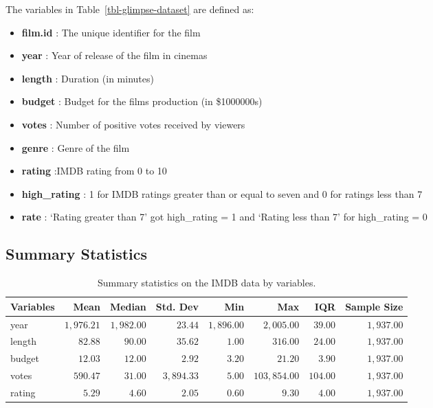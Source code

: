 \documentclass[
  letterpaper,
  DIV=11,
  numbers=noendperiod]{scrartcl}
\begin{document}
The variables in Table~\ref{tbl-glimpse-dataset} are defined as:

\begin{itemize}
\item
  \textbf{film.id} : The unique identifier for the film
\item
  \textbf{year} : Year of release of the film in cinemas
\item
  \textbf{length} : Duration (in minutes)
\item
  \textbf{budget} : Budget for the films production (in \$1000000s)
\item
  \textbf{votes} : Number of positive votes received by viewers
\item
  \textbf{genre} : Genre of the film
\item
  \textbf{rating} :IMDB rating from 0 to 10
\item
  \textbf{high\_rating} : 1 for IMDB ratings greater than or equal to
  seven and 0 for ratings less than 7
\item
  \textbf{rate} : `Rating greater than 7' got high\_rating = 1 and
  `Rating less than 7' for high\_rating = 0 \clearpage
\end{itemize}

\hypertarget{sec-sum}{%
\subsection{Summary Statistics}\label{sec-sum}}

\hypertarget{tbl-summary-statistics}{}
\begin{longtable}{lrrrrrrr}
\caption{\label{tbl-summary-statistics}Summary statistics on the IMDB data by variables. }\tabularnewline

\toprule
Variables & Mean & Median & Std. Dev & Min & Max & IQR & Sample Size \\ 
\midrule\addlinespace[2.5pt]
year & $1,976.21$ & $1,982.00$ & $23.44$ & $1,896.00$ & $2,005.00$ & $39.00$ & $1,937.00$ \\ 
length & $82.88$ & $90.00$ & $35.62$ & $1.00$ & $316.00$ & $24.00$ & $1,937.00$ \\ 
budget & $12.03$ & $12.00$ & $2.92$ & $3.20$ & $21.20$ & $3.90$ & $1,937.00$ \\ 
votes & $590.47$ & $31.00$ & $3,894.33$ & $5.00$ & $103,854.00$ & $104.00$ & $1,937.00$ \\ 
rating & $5.29$ & $4.60$ & $2.05$ & $0.60$ & $9.30$ & $4.00$ & $1,937.00$ \\ 
\bottomrule
\end{longtable}
\end{document}
